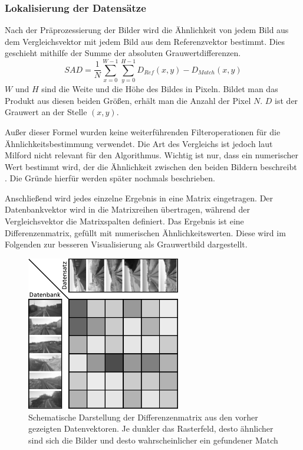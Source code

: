 \documentclass[12pt,a4paper,titlepage]{scrartcl}
\begin{document}
\subsubsection{Lokalisierung der Datensätze}
Nach der Präprozessierung der Bilder wird die Ähnlichkeit von jedem Bild aus dem Vergleichsvektor mit jedem Bild aus dem Referenzvektor bestimmt. Dies geschieht mithilfe der Summe der absoluten Grauwertdifferenzen. 
\begin{equation}
SAD=\frac{1}{N}\sum_{x=0}^{W-1}\sum_{y=0}^{H-1}D_{Ref}(x,y)-D_{Match}(x, y)
\end{equation}
$W$ und $H$ sind die Weite und die Höhe des Bildes in Pixeln. Bildet man das Produkt aus diesen beiden Größen, erhält man die Anzahl der Pixel $N$. $D$ ist der Grauwert an der Stelle $(x, y)$. 

Außer dieser Formel wurden keine weiterführenden Filteroperationen für die Ähnlichkeitsbestimmung verwendet. Die Art des Vergleichs ist jedoch laut Milford nicht relevant für den Algorithmus. Wichtig ist nur, dass ein numerischer Wert bestimmt wird, der die Ähnlichkeit zwischen den beiden Bildern beschreibt \cite{milford2012seqslam}. Die Gründe hierfür werden später nochmals beschrieben.

Anschließend wird jedes einzelne Ergebnis in eine Matrix eingetragen. Der Datenbankvektor wird in die Matrixreihen übertragen, während der Vergleichsvektor die Matrixspalten definiert. Das Ergebnis ist eine Differenzenmatrix, gefüllt mit numerischen Ähnlichkeitswerten. Diese wird im Folgenden zur besseren Visualisierung als Grauwertbild dargestellt.

\begin{figure}[!h]
	\centering
	\includegraphics[width=0.6\textwidth]{../Bilder/Differenzenmatrix.pdf}
	\caption[Schematische Darstellung der Differenzenmatrix]{Schematische Darstellung der Differenzenmatrix aus den vorher gezeigten Datenvektoren. Je dunkler das Rasterfeld, desto ähnlicher sind sich die Bilder und desto wahrscheinlicher ein gefundener Match}
	\label{img:dif_Mat}
\end{figure}
\end{document}
